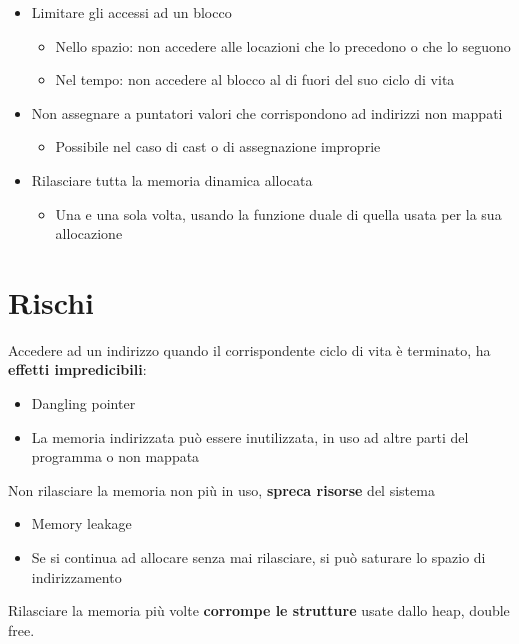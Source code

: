 \begin{itemize}
  \item Limitare gli accessi ad un blocco
        \begin{itemize}
          \item Nello spazio: non accedere alle locazioni che lo precedono o che lo seguono
          \item Nel tempo: non accedere al blocco al di fuori del suo ciclo di vita
        \end{itemize}
  \item Non assegnare a puntatori valori che corrispondono ad indirizzi non mappati
        \begin{itemize}
          \item Possibile nel caso di cast o di assegnazione improprie
        \end{itemize}
  \item Rilasciare tutta la memoria dinamica allocata
        \begin{itemize}
          \item Una e una sola volta, usando la funzione duale di quella usata per la sua allocazione
        \end{itemize}
\end{itemize}


\section{Rischi }

Accedere ad un indirizzo quando il corrispondente ciclo di vita è terminato, ha
\textbf{effetti impredicibili}:

\begin{itemize}
  \item Dangling pointer
  \item La memoria indirizzata può essere inutilizzata, in uso ad altre parti del programma o non mappata
\end{itemize}

Non rilasciare la memoria non più in uso, \textbf{spreca risorse} del sistema

\begin{itemize}
  \item Memory leakage
  \item Se si continua ad allocare senza mai rilasciare, si può saturare lo spazio di indirizzamento
\end{itemize}

Rilasciare la memoria più volte \textbf{corrompe le strutture} usate dallo heap, double free.\newline

